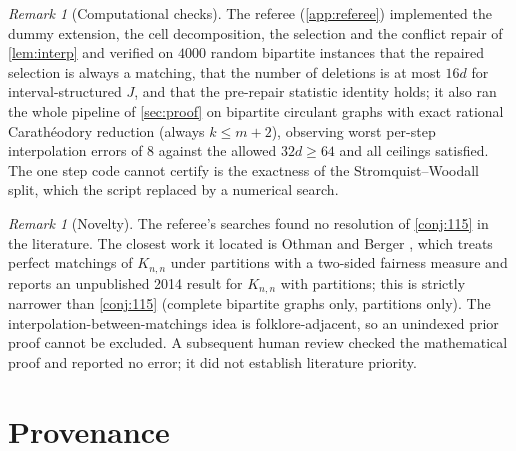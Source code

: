 \documentclass[11pt,a4paper]{article}
\theoremstyle{plain}
\theoremstyle{definition}
\theoremstyle{remark}
\newtheorem{remark}[theorem]{Remark}
\begin{document}
\begin{remark}[Computational checks]\label{rem:computation}
The referee (\cref{app:referee}) implemented the dummy extension, the cell decomposition, the selection and the conflict repair of \cref{lem:interp} and verified on $4000$ random bipartite instances that the repaired selection is always a matching, that the number of deletions is at most $16d$ for interval-structured $J$, and that the pre-repair statistic identity holds; it also ran the whole pipeline of \cref{sec:proof} on bipartite circulant graphs with exact rational Carathéodory reduction (always $k\le m+2$), observing worst per-step interpolation errors of $8$ against the allowed $32d\ge64$ and all ceilings satisfied. The one step code cannot certify is the exactness of the Stromquist--Woodall split, which the script replaced by a numerical search.
\end{remark}

\begin{remark}[Novelty]\label{rem:novelty}
The referee's searches found no resolution of \cref{conj:115} in the literature. The closest work it located is Othman and Berger \cite{OB24}, which treats perfect matchings of $K_{n,n}$ under partitions with a two-sided fairness measure and reports an unpublished 2014 result for $K_{n,n}$ with partitions; this is strictly narrower than \cref{conj:115} (complete bipartite graphs only, partitions only). The interpolation-between-matchings idea is folklore-adjacent, so an unindexed prior proof cannot be excluded. A subsequent human review checked the mathematical proof and reported no error; it did not establish literature priority.
\end{remark}

\section{Provenance}\label{sec:provenance}
\end{document}
